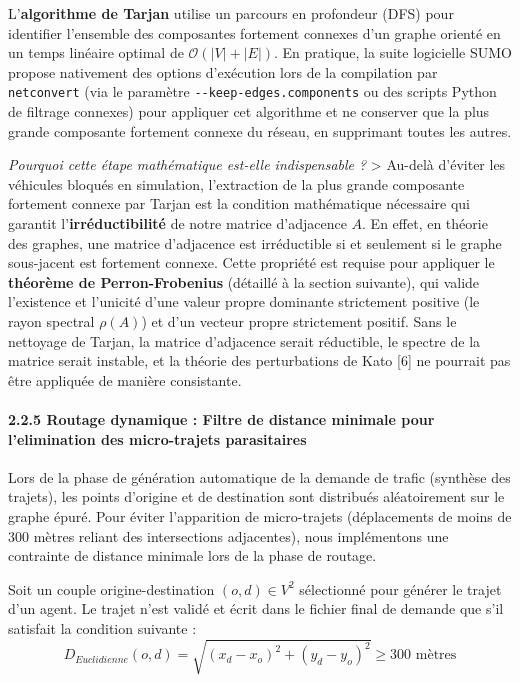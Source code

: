 \documentclass[10pt, a4paper]{article}
\begin{document}
L'\textbf{algorithme de Tarjan} utilise un parcours en profondeur (DFS)
pour identifier l'ensemble des composantes fortement connexes d'un
graphe orienté en un temps linéaire optimal de
\(\mathcal{O}(|V| + |E|)\). En pratique, la suite logicielle SUMO
propose nativement des options d'exécution lors de la compilation par
\texttt{netconvert} (via le paramètre \texttt{-\/-keep-edges.components}
ou des scripts Python de filtrage connexes) pour appliquer cet
algorithme et ne conserver que la plus grande composante fortement
connexe du réseau, en supprimant toutes les autres.

\emph{Pourquoi cette étape mathématique est-elle indispensable ?}
\textgreater{} Au-delà d'éviter les véhicules bloqués en simulation,
l'extraction de la plus grande composante fortement connexe par Tarjan
est la condition mathématique nécessaire qui garantit
l'\textbf{irréductibilité} de notre matrice d'adjacence \(A\). En effet,
en théorie des graphes, une matrice d'adjacence est irréductible si et
seulement si le graphe sous-jacent est fortement connexe. Cette
propriété est requise pour appliquer le \textbf{théorème de
Perron-Frobenius} (détaillé à la section suivante), qui valide
l'existence et l'unicité d'une valeur propre dominante strictement
positive (le rayon spectral \(\rho(A)\)) et d'un vecteur propre
strictement positif. Sans le nettoyage de Tarjan, la matrice d'adjacence
serait réductible, le spectre de la matrice serait instable, et la
théorie des perturbations de Kato {[}6{]} ne pourrait pas être appliquée
de manière consistante.

\paragraph{2.2.5 Routage dynamique : Filtre de distance minimale pour
l'elimination des micro-trajets
parasitaires}\label{routage-dynamique-filtre-de-distance-minimale-pour-lelimination-des-micro-trajets-parasitaires}

Lors de la phase de génération automatique de la demande de trafic
(synthèse des trajets), les points d'origine et de destination sont
distribués aléatoirement sur le graphe épuré. Pour éviter l'apparition
de micro-trajets (déplacements de moins de 300 mètres reliant des
intersections adjacentes), nous implémentons une contrainte de distance
minimale lors de la phase de routage.

Soit un couple origine-destination \((o, d) \in V^2\) sélectionné pour
générer le trajet d'un agent. Le trajet n'est validé et écrit dans le
fichier final de demande que s'il satisfait la condition suivante :
\[D_{Euclidienne}(o, d) = \sqrt{(x_d - x_o)^2 + (y_d - y_o)^2} \ge 300 \text{ mètres}\]
\end{document}
